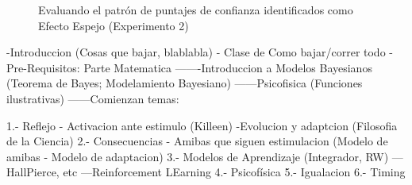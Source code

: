 \begin{figure}[th]
\caption[MERating_Exp2]{Evaluando el patrón de puntajes de confianza identificados como Efecto Espejo (Experimento 2)}
\label{fig:MERating_E2}
\end{figure}












 
-Introduccion (Cosas que bajar, blablabla) - Clase de Como bajar/correr todo
-Pre-Requisitos: Parte Matematica
-------Introduccion a Modelos Bayesianos (Teorema de Bayes; Modelamiento Bayesiano)
------Psicofisica (Funciones ilustrativas)
------Comienzan temas:

1.- Reflejo - Activacion ante estimulo (Killeen)
-Evolucion  y adaptcion (Filosofia de la Ciencia)
2.- Consecuencias - Amibas que siguen estimulacion (Modelo de amibas - Modelo de adaptacion)
3.- Modelos de Aprendizaje (Integrador, RW)
---HallPierce, etc
---Reinforcement LEarning
4.- Psicofísica
5.- Igualacion
6.- Timing



